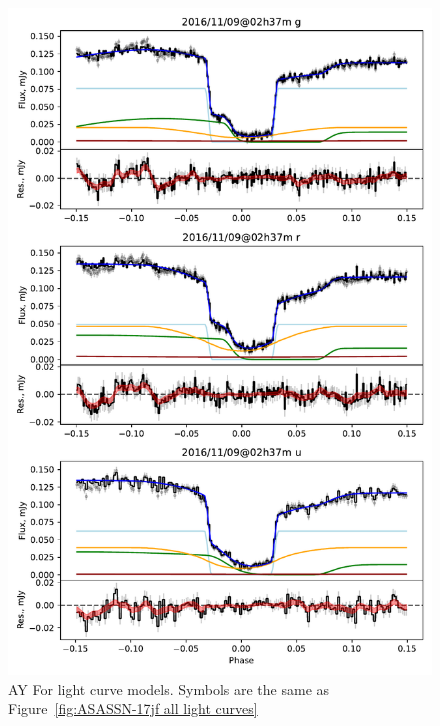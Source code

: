 \begin{figure}
    \centering
    \includegraphics[width=\textwidth]{figures/results/AYFor/AYFor_1.pdf}
    \caption{AY For light curve models. Symbols are the same as Figure~\ref{fig:ASASSN-17jf all light curves}}
    \label{fig:AYFor all light curves}
\end{figure}
